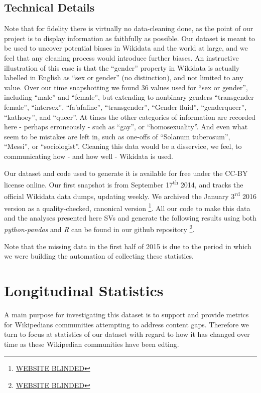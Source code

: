 \documentclass{sig-alternate-05-2015}
\begin{document}
\subsection{Technical Details}

Note that for fidelity there is virtually no data-cleaning done, as the point of our project is to display information as faithfully as possible. Our dataset is meant to be used to uncover potential biases in Wikidata and the world at large, and we feel that any cleaning process would introduce further biases. An instructive illustration of this case is that the ``gender'' property in Wikidata is actually labelled in English  as ``sex or gender'' (no distinction), and not limited to any value. Over our time snapshotting we found 36 values used for ``sex or gender'', including ``male'' and ``female'', but extending to nonbinary genders ``transgender female'', ``intersex'', ``fa'afafine'', ``transgender'', ``Gender fluid'',  ``genderqueer'', ``kathoey'', and ``queer''. At times the other categories of information are recorded here - perhaps erroneously - such as ``gay'', or ``homosexuality''. And even what seem to be mistakes are left in, such as one-offs of ``Solanum tuberosum'', ``Messi'', or ``sociologist''. Cleaning this data would be a disservice, we feel, to communicating how - and how well - Wikidata is used.


Our dataset and code used to generate it is available for free under the CC-BY license online. Our first snapshot is from September 17\textsuperscript{th} 2014, and tracks the official  Wikidata data dumps, updating weekly. We archived the January 3\textsuperscript{rd} 2016 version as a quality-checked, canonical version \footnote{\url{WEBSITE BLINDED}}. All our code to make this data and the analyses presented here SVs and generate the following results using both \textit{python-pandas} and \textit{R} can be found in our github repository \footnote{\url{WEBSITE BLINDED}}.

Note that the missing data in the first half of 2015 is due to  the period in which we were building the automation of collecting these statistics. 


\section{Longitudinal Statistics}
A main purpose for investigating this dataset is to support and provide metrics for Wikipedians communities attempting to  address content gaps. Therefore we turn to focus at statistics of our dataset with regard to how it has changed over time as these Wikipedian communities have been edting. 
\end{document}
